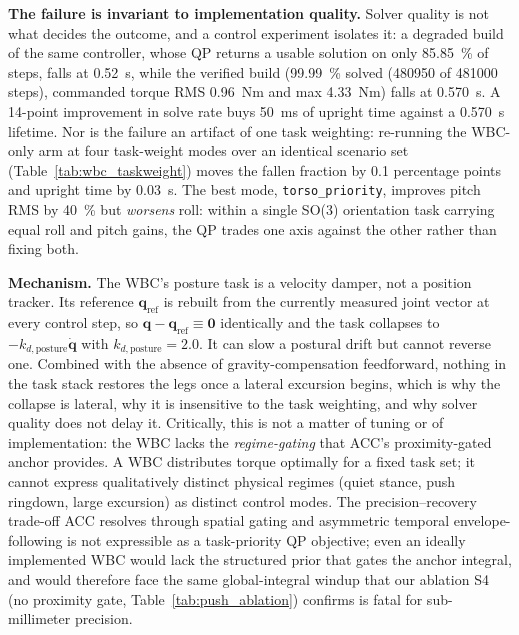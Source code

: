 \documentclass[conference]{IEEEtran}
\begin{document}
\medskip\noindent\textbf{The failure is invariant to implementation quality.}
Solver quality is not what decides the outcome, and a control experiment isolates it: a degraded build of the same controller, whose QP returns a usable solution on only \SI{85.85}{\percent} of steps, falls at \SI{0.52}{s}, while the verified build (\SI{99.99}{\percent} solved (\num{480950} of \num{481000} steps), commanded torque RMS \SI{0.96}{Nm} and max \SI{4.33}{Nm}) falls at \SI{0.570}{s}.
A \num{14}-point improvement in solve rate buys \SI{50}{ms} of upright time against a \SI{0.570}{s} lifetime.
Nor is the failure an artifact of one task weighting: re-running the WBC-only arm at four task-weight modes over an identical scenario set (Table~\ref{tab:wbc_taskweight}) moves the fallen fraction by \num{0.1} percentage points and upright time by \SI{0.03}{s}.
The best mode, \texttt{torso\_priority}, improves pitch RMS by \SI{40}{\percent} but \emph{worsens} roll: within a single SO(3) orientation task carrying equal roll and pitch gains, the QP trades one axis against the other rather than fixing both.

\medskip\noindent\textbf{Mechanism.}
The WBC's posture task is a velocity damper, not a position tracker.
Its reference $\mathbf{q}_{\text{ref}}$ is rebuilt from the currently measured joint vector at every control step, so $\mathbf{q}-\mathbf{q}_{\text{ref}} \equiv \mathbf{0}$ identically and the task collapses to $-k_{d,\text{posture}}\dot{\mathbf{q}}$ with $k_{d,\text{posture}}{=}2.0$.
It can slow a postural drift but cannot reverse one.
Combined with the absence of gravity-compensation feedforward, nothing in the task stack restores the legs once a lateral excursion begins, which is why the collapse is lateral, why it is insensitive to the task weighting, and why solver quality does not delay it.
Critically, this is not a matter of tuning or of implementation: the WBC lacks the \emph{regime-gating} that ACC's proximity-gated anchor provides.
A WBC distributes torque optimally for a fixed task set; it cannot express qualitatively distinct physical regimes (quiet stance, push ringdown, large excursion) as distinct control modes.
The precision--recovery trade-off ACC resolves through spatial gating and asymmetric temporal envelope-following is not expressible as a task-priority QP objective; even an ideally implemented WBC would lack the structured prior that gates the anchor integral, and would therefore face the same global-integral windup that our ablation S4 (no proximity gate, Table~\ref{tab:push_ablation}) confirms is fatal for sub-millimeter precision.
\end{document}
